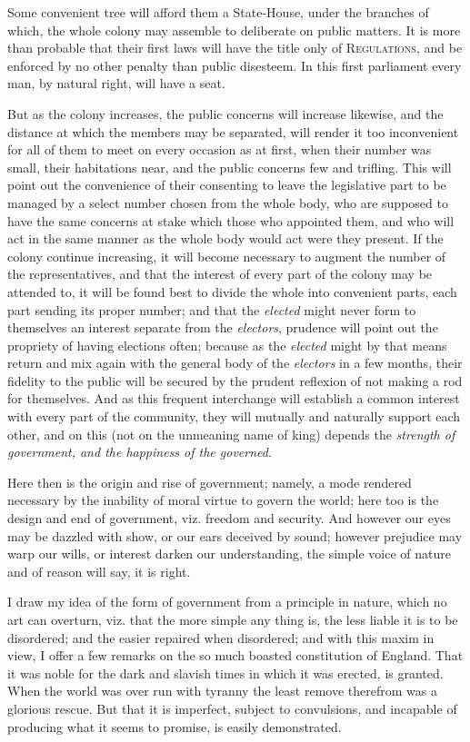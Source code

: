 \documentclass[12pt, twocolumn]{book}
\begin{document}
    Some convenient tree will afford them a State-House, under the branches of which, the whole colony may assemble to deliberate on public matters. It is more than probable that their first laws will have the title only of \textsc{Regulations}, and be enforced by no other penalty than public disesteem. In this first parliament every man, by natural right, will have a seat.

    But as the colony increases, the public concerns will increase likewise, and the distance at which the members may be separated, will render it too inconvenient for all of them to meet on every occasion as at first, when their number was small, their habitations near, and the public concerns few and trifling. This will point out the convenience of their consenting to leave the legislative part to be managed by a select number chosen from the whole body, who are supposed to have the same concerns at stake which those who appointed them, and who will act in the same manner as the whole body would act were they present. If the colony continue increasing, it will become necessary to augment the number of the representatives, and that the interest of every part of the colony may be attended to, it will be found best to divide the whole into convenient parts, each part sending its proper number; and that the \textit{elected} might never form to themselves an interest separate from the \textit{electors}, prudence will point out the propriety of having elections often; because as the \textit{elected} might by that means return and mix again with the general body of the \textit{electors} in a few months, their fidelity to the public will be secured by the prudent reflexion of not making a rod for themselves. And as this frequent interchange will establish a common interest with every part of the community, they will mutually and naturally support each other, and on this (not on the unmeaning name of king) depends the \textit{strength of government, and the happiness of the governed}.

    Here then is the origin and rise of government; namely, a mode rendered necessary by the inability of moral virtue to govern the world; here too is the design and end of government, viz. freedom and security. And however our eyes may be dazzled with show, or our ears deceived by sound; however prejudice may warp our wills, or interest darken our understanding, the simple voice of nature and of reason will say, it is right.

    I draw my idea of the form of government from a principle in nature, which no art can overturn, viz. that the more simple any thing is, the less liable it is to be disordered; and the easier repaired when disordered; and with this maxim in view, I offer a few remarks on the so much boasted constitution of England. That it was noble for the dark and slavish times in which it was erected, is granted. When the world was over run with tyranny the least remove therefrom was a glorious rescue. But that it is imperfect, subject to convulsions, and incapable of producing what it seems to promise, is easily demonstrated.
\end{document}
